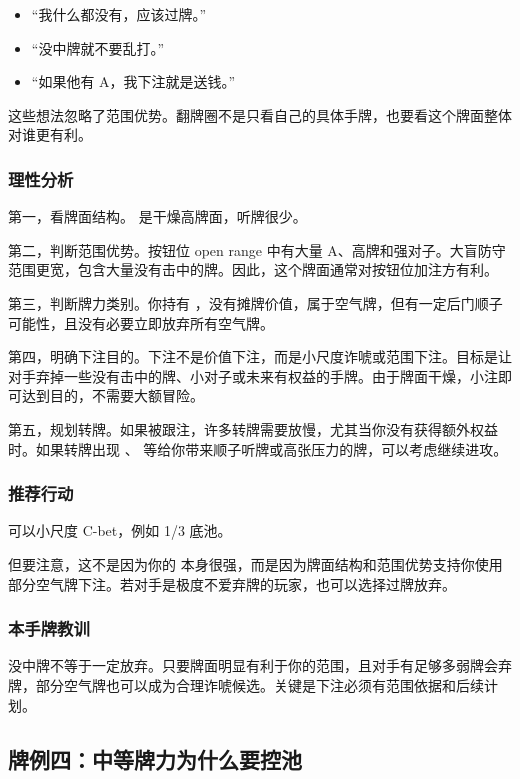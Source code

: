\begin{itemize}
\item “我什么都没有，应该过牌。”
\item “没中牌就不要乱打。”
\item “如果他有 A，我下注就是送钱。”
\end{itemize}

这些想法忽略了范围优势。翻牌圈不是只看自己的具体手牌，也要看这个牌面整体对谁更有利。

\subsubsection*{理性分析}

第一，看牌面结构。 是干燥高牌面，听牌很少。

第二，判断范围优势。按钮位 open range 中有大量 A、高牌和强对子。大盲防守范围更宽，包含大量没有击中的牌。因此，这个牌面通常对按钮位加注方有利。

第三，判断牌力类别。你持有 ，没有摊牌价值，属于空气牌，但有一定后门顺子可能性，且没有必要立即放弃所有空气牌。

第四，明确下注目的。下注不是价值下注，而是小尺度诈唬或范围下注。目标是让对手弃掉一些没有击中的牌、小对子或未来有权益的手牌。由于牌面干燥，小注即可达到目的，不需要大额冒险。

第五，规划转牌。如果被跟注，许多转牌需要放慢，尤其当你没有获得额外权益时。如果转牌出现 、 等给你带来顺子听牌或高张压力的牌，可以考虑继续进攻。

\subsubsection*{推荐行动}

可以小尺度 C-bet，例如 1/3 底池。

但要注意，这不是因为你的  本身很强，而是因为牌面结构和范围优势支持你使用部分空气牌下注。若对手是极度不爱弃牌的玩家，也可以选择过牌放弃。

\subsubsection*{本手牌教训}

没中牌不等于一定放弃。只要牌面明显有利于你的范围，且对手有足够多弱牌会弃牌，部分空气牌也可以成为合理诈唬候选。关键是下注必须有范围依据和后续计划。

\subsection{牌例四：中等牌力为什么要控池}

